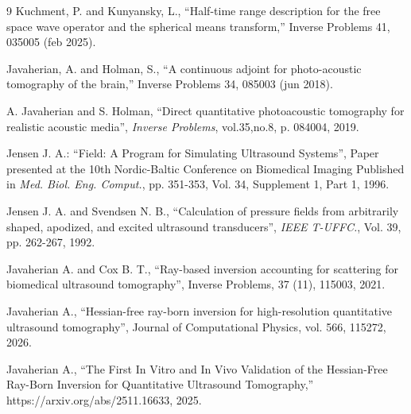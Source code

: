 \documentclass[11pt,reqno]{amsart}
\theoremstyle{remark}
\theoremstyle{italic_lemma}
\begin{document}
\begin{thebibliography}{9}
Kuchment, P. and Kunyansky, L., “Half-time range description for the free space wave operator and the spherical
means transform,” Inverse Problems 41, 035005 (feb 2025).

Javaherian, A. and Holman, S., “A continuous adjoint for photo-acoustic tomography of the brain,” Inverse
Problems 34, 085003 (jun 2018).

A. Javaherian and S. Holman, “Direct quantitative photoacoustic tomography for realistic acoustic media”, \textit{Inverse Problems}, vol.35,no.8, p. 084004, 2019. 



Jensen J. A.: “Field: A Program for Simulating Ultrasound Systems”, Paper presented at the 10th Nordic-Baltic Conference on Biomedical Imaging Published in \textit{Med. Biol. Eng. Comput.}, pp. 351-353, Vol. 34, Supplement 1, Part 1, 1996.

Jensen J. A. and Svendsen N. B., “Calculation of pressure fields from arbitrarily shaped, apodized, and excited ultrasound transducers”, \textit{IEEE T-UFFC.}, Vol. 39, pp. 262-267, 1992.


Javaherian A. and Cox B. T., “Ray-based inversion accounting for scattering for biomedical ultrasound tomography”, Inverse Problems, 37 (11), 115003, 2021.

Javaherian A., “Hessian-free ray-born inversion for high-resolution quantitative ultrasound tomography”, Journal of Computational Physics, vol.  566, 115272, 2026.

Javaherian A., “The First In Vitro and In Vivo Validation of the Hessian-Free Ray-Born Inversion for Quantitative Ultrasound Tomography,” https://arxiv.org/abs/2511.16633, 2025.


\end{thebibliography}
\end{document}
